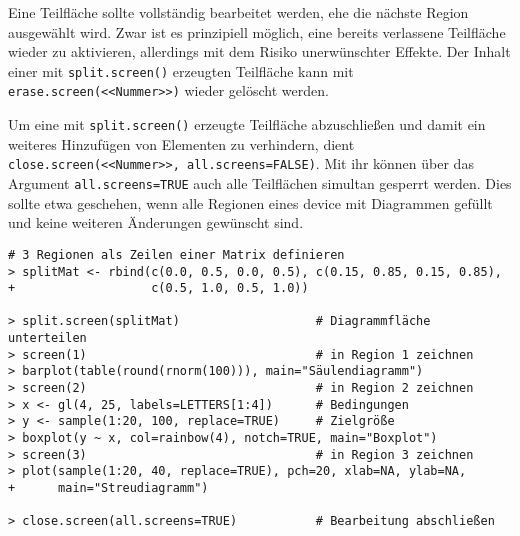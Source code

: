 Eine Teilfläche sollte vollständig bearbeitet werden, ehe die nächste Region ausgewählt wird. Zwar ist es prinzipiell möglich, eine bereits verlassene Teilfläche wieder zu aktivieren, allerdings mit dem Risiko unerwünschter Effekte. Der Inhalt einer mit \lstinline!split.screen()! erzeugten Teilfläche kann mit \lstinline!erase.screen(<<Nummer>>)! wieder gelöscht werden.

Um eine mit \lstinline!split.screen()! erzeugte Teilfläche abzuschließen und damit ein weiteres Hinzufügen von Elementen zu verhindern, dient \lstinline!close.screen(<<Nummer>>, all.screens=FALSE)!. Mit ihr können über das Argument \lstinline!all.screens=TRUE! auch alle Teilflächen simultan gesperrt werden. Dies sollte etwa geschehen, wenn alle Regionen eines device mit Diagrammen gefüllt und keine weiteren Änderungen gewünscht sind.
\begin{lstlisting}
# 3 Regionen als Zeilen einer Matrix definieren
> splitMat <- rbind(c(0.0, 0.5, 0.0, 0.5), c(0.15, 0.85, 0.15, 0.85),
+                   c(0.5, 1.0, 0.5, 1.0))

> split.screen(splitMat)                   # Diagrammfläche unterteilen
> screen(1)                                # in Region 1 zeichnen
> barplot(table(round(rnorm(100))), main="Säulendiagramm")
> screen(2)                                # in Region 2 zeichnen
> x <- gl(4, 25, labels=LETTERS[1:4])      # Bedingungen
> y <- sample(1:20, 100, replace=TRUE)     # Zielgröße
> boxplot(y ~ x, col=rainbow(4), notch=TRUE, main="Boxplot")
> screen(3)                                # in Region 3 zeichnen
> plot(sample(1:20, 40, replace=TRUE), pch=20, xlab=NA, ylab=NA,
+      main="Streudiagramm")

> close.screen(all.screens=TRUE)           # Bearbeitung abschließen
\end{lstlisting}
